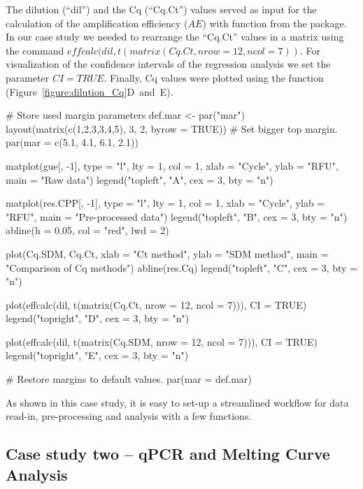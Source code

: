 The dilution (``dil'') and the Cq (``Cq.Ct'') values served as input for the 
calculation of the amplification efficiency ($AE$) with  function 
from the  package. In our case study we needed to rearrange 
the 
``Cq.Ct'' values in a matrix using the command $effcalc(dil, t(matrix(Cq.Ct, 
nrow = 12, ncol = 7))$. For visualization of the confidence intervals of the 
regression analysis we set the parameter $CI = TRUE$. Finally, Cq values were 
plotted 
using the  function (Figure~\ref{figure:dilution_Cq}D~and~E).

\begin{example}
# Store used margin parameters
def.mar <- par("mar")
layout(matrix(c(1,2,3,3,4,5), 3, 2, byrow = TRUE))
# Set bigger top margin.
par(mar = c(5.1, 4.1, 6.1, 2.1))

matplot(gue[, -1], type = "l", lty = 1, col = 1, xlab = "Cycle", 
	    ylab = "RFU", main = "Raw data")
legend("topleft", "A", cex = 3, bty = "n")

matplot(res.CPP[, -1], type = "l", lty = 1, col = 1, xlab = "Cycle", 
	ylab = "RFU", main = "Pre-processed data")
legend("topleft", "B", cex = 3, bty = "n")
abline(h = 0.05, col = "red", lwd = 2)

plot(Cq.SDM, Cq.Ct, xlab = "Ct method", ylab = "SDM method", 
     main = "Comparison of Cq methods")
abline(res.Cq)
legend("topleft", "C", cex = 3, bty = "n")

plot(effcalc(dil, t(matrix(Cq.Ct, nrow = 12, ncol = 7))), CI = TRUE)
legend("topright", "D", cex = 3, bty = "n")

plot(effcalc(dil, t(matrix(Cq.SDM, nrow = 12, ncol = 7))), CI = TRUE)
legend("topright", "E", cex = 3, bty = "n")

# Restore margins to default values.
par(mar = def.mar)
\end{example}

As shown in this case study, it is easy to set-up a streamlined workflow for 
data 
read-in, pre-processing and analysis with a few functions.

\subsection{Case study two -- qPCR and Melting Curve Analysis}

